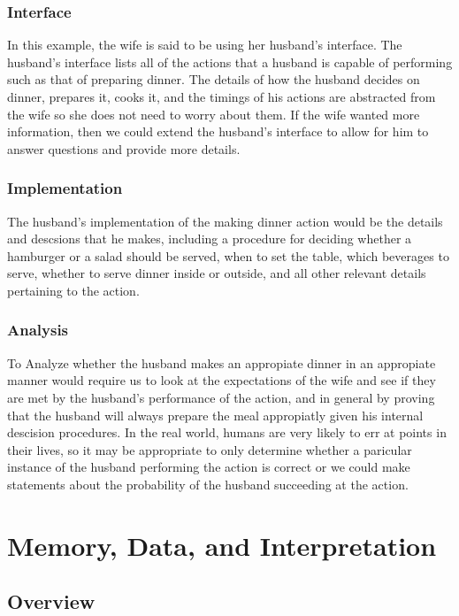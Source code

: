 \documentclass[12pt, letterpaper]{book}
\begin{document}
	\subsection{Interface}

		In this example, the wife is said to be using her husband's interface. The husband's interface lists all of the actions that a husband is capable of performing such as that of preparing dinner. The details of how the husband decides on dinner, prepares it, cooks it, and the timings of his actions are abstracted from the wife so she does not need to worry about them. If the wife wanted more information, then we could extend the husband's interface to allow for him to answer questions and provide more details.

	\subsection{Implementation}

	The husband's implementation of the making dinner action would be the details and descsions that he makes, including a procedure for deciding whether a hamburger or a salad should be served, when to set the table, which beverages to serve, whether to serve dinner inside or outside, and all other relevant details pertaining to the action.

	\subsection{Analysis}

	To Analyze whether the husband makes an appropiate dinner in an appropiate manner would require us to look at the expectations of the wife and see if they are met by the husband's performance of the action, and in general by proving that the husband will always prepare the meal appropiatly given his internal descision procedures. In the real world, humans are very likely to err at points in their lives, so it may be appropriate to only determine whether a paricular instance of the husband performing the action is correct or we could make statements about the probability of the husband succeeding at the action.


\chapter{Memory, Data, and Interpretation} \label{memory}

	\section{Overview}
\end{document}
